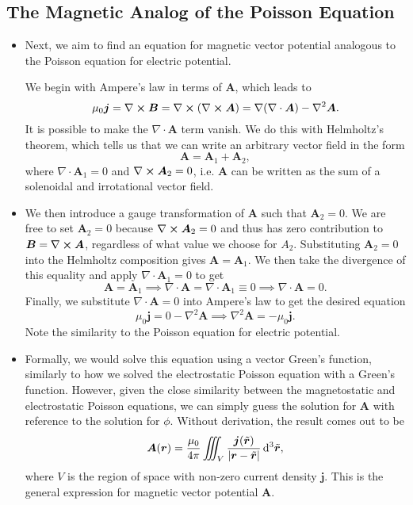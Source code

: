 \documentclass[11pt, a4paper]{article}
\newcommand{\diff}{\mathop{}\!\mathrm{d}} %
\newcommand{\dtr}{\diff^{3} \tilde{\r}}  %
\renewcommand{\vec}[1]{\bm{#1}} %
\renewcommand{\t}[1]{\tilde{#1}} %
\renewcommand{\r}{\vec{r}}
\newcommand{\B}{\vec{B}} %
\newcommand{\A}{\vec{A}} %
\newcommand{\mm}{\mu_{0}}  %
\renewcommand{\j}{\vec{j}}  %
\renewcommand{\div}{\nabla \cdot}
\renewcommand{\curl}{\nabla \cross}
\renewcommand{\grad}{\nabla}
\renewcommand{\laplacian}{\nabla^{2}}
\begin{document}
\subsection{The Magnetic Analog of the Poisson Equation}
\begin{itemize}
	\item Next, we aim to find an equation for magnetic vector potential analogous to the Poisson equation for electric potential. 

    We begin with Ampere's law in terms of $ \A $, which leads to
	\begin{equation*}
		\mm \j = \curl \B = \curl (\curl \A) = \grad (\div \A) - \laplacian \A.
	\end{equation*}
	It is possible to make the $ \div \A $ term vanish. We do this with Helmholtz's theorem, which tells us that we can write an arbitrary vector field in the form
	\begin{equation*}
		\A = \A_{1} + \A_{2},
	\end{equation*}
	where $ \div \A_{1} = 0 $ and $ \curl \A_{2} = 0 $, i.e. $ \A $ can be written as the sum of a solenoidal and irrotational vector field.
	
    \item We then introduce a gauge transformation of $ \A $ such that $ \A_{2} = 0 $. We are free to set $ \A_{2} = 0 $ because $ \curl \A_{2} = 0 $ and thus has zero contribution to $ \B = \curl \A $, regardless of what value we choose for $ A_{2} $. Substituting $ \A_{2} = 0 $ into the Helmholtz composition gives $ \A = \A_{1} $. We then take the divergence of this equality and apply $ \div \A_{1} = 0 $ to get
    \begin{equation*}
        \A = \A_{1} \implies \div \A = \div \A_{1} \equiv 0 \implies \div \A = 0.
    \end{equation*}
    Finally, we substitute $ \div \A = 0 $ into Ampere's law to get the desired equation
    \begin{equation*}
        \mm \j = 0 - \laplacian \A \implies \laplacian \A = - \mm \j.
    \end{equation*}
	Note the similarity to the Poisson equation for electric potential.
	
    \item Formally, we would solve this equation using a vector Green's function, similarly to how we solved the electrostatic Poisson equation with a Green's function. However, given the close similarity between the magnetostatic and electrostatic Poisson equations, we can simply guess the solution for $ \A $ with reference to the solution for $ \phi $. Without derivation, the result comes out to be
	\begin{equation*}
		\A(\r) = \frac{\mm}{4\pi} \iiint_{V} \frac{\j(\t{\r})}{\abs{\r - \t{\r}}} \dtr,
	\end{equation*}
	where $ V $ is the region of space with non-zero current density $ \j $. This is the general expression for magnetic vector potential $ \A $. 
	

\end{itemize}
\end{document}
